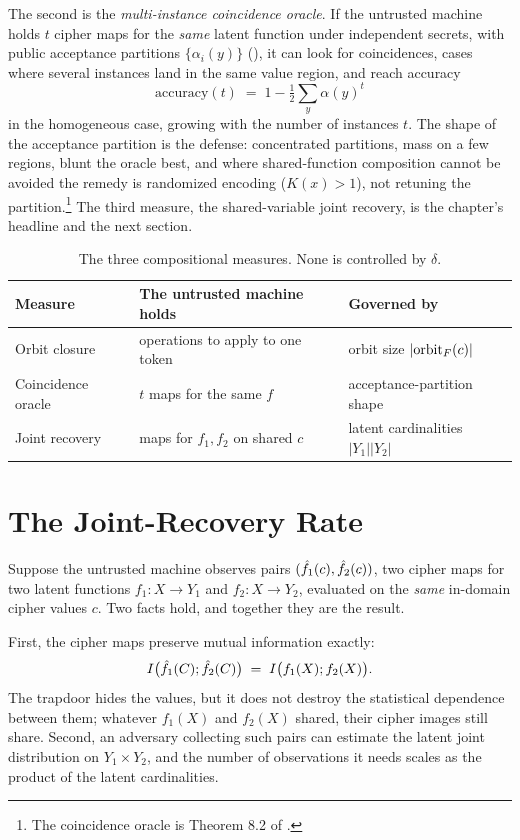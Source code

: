 The second is the \emph{multi-instance coincidence oracle}. If the untrusted
machine holds $t$ cipher maps for the \emph{same} latent function under
independent secrets, with public acceptance partitions $\{\alpha_i(y)\}$
(), it can look for coincidences, cases where several
instances land in the same value region, and reach accuracy
\[
  \mathrm{accuracy}(t) \;=\; 1 - \tfrac12\sum_{y} \alpha(y)^{t}
\]
in the homogeneous case, growing with the number of instances $t$. The shape
of the acceptance partition is the defense: concentrated partitions, mass on
a few regions, blunt the oracle best, and where shared-function composition
cannot be avoided the remedy is randomized encoding ($K(x) > 1$), not
retuning the partition.\footnote{The coincidence oracle is Theorem 8.2 of
\cite{towell2026cipher}.} The third measure, the shared-variable joint
recovery, is the chapter's headline and the next section.

\begin{table}[t]
\centering
\caption{The three compositional measures. None is controlled by $\delta$.}
\label{tab:measures}
\begin{tabular}{@{}lll@{}}
\toprule
Measure & The untrusted machine holds & Governed by \\
\midrule
Orbit closure & operations to apply to one token & orbit size $\lvert\operatorname{orbit}_F(c)\rvert$ \\
Coincidence oracle & $t$ maps for the same $f$ & acceptance-partition shape \\
Joint recovery & maps for $f_1, f_2$ on shared $c$ & latent cardinalities $\lvert Y_1\rvert\lvert Y_2\rvert$ \\
\bottomrule
\end{tabular}
\end{table}

\section{The Joint-Recovery Rate}
\label{sec:joint-recovery}

Suppose the untrusted machine observes pairs $(\hat{f}_1(c), \hat{f}_2(c))$,
two cipher maps for two latent functions $f_1 : X \to Y_1$ and
$f_2 : X \to Y_2$, evaluated on the \emph{same} in-domain cipher values $c$.
Two facts hold, and together they are the result.

First, the cipher maps preserve mutual information exactly:
\[
  I\bigl(\hat{f}_1(C); \hat{f}_2(C)\bigr) \;=\; I\bigl(f_1(X); f_2(X)\bigr).
\]
The trapdoor hides the values, but it does not destroy the statistical
dependence between them; whatever $f_1(X)$ and $f_2(X)$ shared, their cipher
images still share. Second, an adversary collecting such pairs can estimate
the latent joint distribution on $Y_1 \times Y_2$, and the number of
observations it needs scales as the product of the latent cardinalities.

